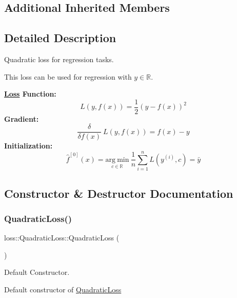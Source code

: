 \subsection*{Additional Inherited Members}


\subsection{Detailed Description}
Quadratic loss for regression tasks. 

This loss can be used for regression with $y \in \mathbb{R}$.

{\bfseries \hyperlink{classloss_1_1_loss}{Loss} Function\+:} \[ L(y, f(x)) = \frac{1}{2}\left( y - f(x) \right)^2 \] {\bfseries Gradient\+:} \[ \frac{\delta}{\delta f(x)}\ L(y, f(x)) = f(x) - y \] {\bfseries Initialization\+:} \[ \hat{f}^{[0]}(x) = \underset{c\in\mathbb{R}}{\mathrm{arg~min}}\ \frac{1}{n}\sum\limits_{i=1}^n L\left(y^{(i)}, c\right) = \bar{y} \] 

\subsection{Constructor \& Destructor Documentation}
\mbox{\label{classloss_1_1_quadratic_loss_acf4a3be5ab3c3aa4d574748c8864bacd}} 
\subsubsection{\texorpdfstring{Quadratic\+Loss()}{QuadraticLoss()}\hspace{0.1cm}{\footnotesize\ttfamily [1/2]}}
{\footnotesize\ttfamily loss\+::\+Quadratic\+Loss\+::\+Quadratic\+Loss (\begin{DoxyParamCaption}{ }\end{DoxyParamCaption})}



Default Constructor. 

Default constructor of {\ttfamily \hyperlink{classloss_1_1_quadratic_loss}{Quadratic\+Loss}} \mbox{\label{classloss_1_1_quadratic_loss_a41fd44734dc6d4f4189e02c79bcf4095}} 
